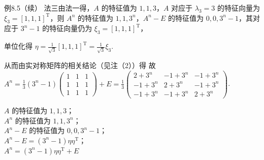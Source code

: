 \begin{fcard}{例8.5（续）}
法三\quad 由法一得，$A$ 的特征值为 $1,1,3$，$A$ 对应于 $\lambda_3=3$ 的特征向量为 $\xi_3=[1,1,1]^{\mathrm T}$，则 $A^{n}$ 的特征值为 $1,1,3^{n}$，$A^{n}-E$ 的特征值为 $0,0,3^{n}-1$，其对应于 $3^{n}-1$ 的特征向量仍为 $\xi_3=[1,1,1]^{\mathrm T}$，

单位化得 $\eta=\frac{1}{\sqrt3}[1,1,1]^{\mathrm T}=\frac{1}{\sqrt3}\xi_3$.

从而由实对称矩阵的相关结论（见注（2））得
故 $A^{n}=\frac13(3^{n}-1)\begin{pmatrix}1&1&1\\1&1&1\\1&1&1\end{pmatrix}+E=\frac13\begin{pmatrix}2+3^{n}&-1+3^{n}&-1+3^{n}\\-1+3^{n}&2+3^{n}&-1+3^{n}\\-1+3^{n}&-1+3^{n}&2+3^{n}\end{pmatrix}$.


$A$ 的特征值为 $1,1,3$；\\
$A^{n}$ 的特征值为 $1,1,3^{n}$；\\
$A^{n}-E$ 的特征值为 $0,0,3^{n}-1$；\\
$A^{n}-E=(3^{n}-1)\eta\eta^{\mathrm T}$；\\
$A^{n}=(3^{n}-1)\eta\eta^{\mathrm T}+E$
\end{fcard}


